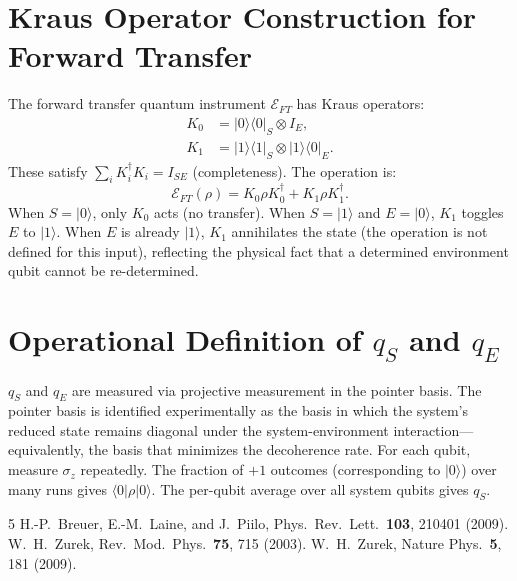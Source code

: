 \documentclass[aps,prl,twocolumn]{revtex4-2}
\begin{document}
\section{Kraus Operator Construction for Forward Transfer}

The forward transfer quantum instrument $\mathcal{E}_{FT}$ has Kraus operators:
\begin{align}
K_0 &= |0\rangle\langle 0|_S \otimes I_E, \\
K_1 &= |1\rangle\langle 1|_S \otimes |1\rangle\langle 0|_E.
\end{align}
These satisfy $\sum_i K_i^\dagger K_i = I_{SE}$ (completeness). The operation is:
\begin{equation}
\mathcal{E}_{FT}(\rho) = K_0 \rho K_0^\dagger + K_1 \rho K_1^\dagger.
\end{equation}
When $S = |0\rangle$, only $K_0$ acts (no transfer). When $S = |1\rangle$ and $E = |0\rangle$, $K_1$ toggles $E$ to $|1\rangle$. When $E$ is already $|1\rangle$, $K_1$ annihilates the state (the operation is not defined for this input), reflecting the physical fact that a determined environment qubit cannot be re-determined.

\section{Operational Definition of $q_S$ and $q_E$}

$q_S$ and $q_E$ are measured via projective measurement in the pointer basis. The pointer basis is identified experimentally as the basis in which the system's reduced state remains diagonal under the system-environment interaction---equivalently, the basis that minimizes the decoherence rate. For each qubit, measure $\sigma_z$ repeatedly. The fraction of $+1$ outcomes (corresponding to $|0\rangle$) over many runs gives $\langle 0|\rho|0\rangle$. The per-qubit average over all system qubits gives $q_S$.

\begin{thebibliography}{5}
 H.-P.~Breuer, E.-M.~Laine, and J.~Piilo, Phys.\ Rev.\ Lett.\ \textbf{103}, 210401 (2009).
 W.~H.~Zurek, Rev.\ Mod.\ Phys.\ \textbf{75}, 715 (2003).
 W.~H.~Zurek, Nature Phys.\ \textbf{5}, 181 (2009).
\end{thebibliography}
\end{document}
